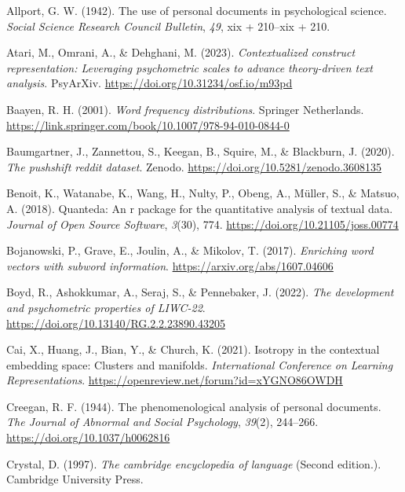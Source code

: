 \documentclass[
  man,
  floatsintext,
  longtable,
  nolmodern,
  notxfonts,
  notimes,
  colorlinks=true,linkcolor=blue,citecolor=blue,urlcolor=blue]{apa7}
\newlength{\cslhangindent}
\newenvironment{CSLReferences}[2] %
 {\begin{list}{}{%
  \setlength{\itemindent}{0pt}
  \setlength{\leftmargin}{0pt}
  \setlength{\parsep}{0pt}
  \ifodd #1
   \setlength{\leftmargin}{\cslhangindent}
   \setlength{\itemindent}{-1\cslhangindent}
  \fi
  \setlength{\itemsep}{#2\baselineskip}}}
 {\end{list}}
\begin{document}
\label{refs}
\begin{CSLReferences}{1}{0}
Allport, G. W. (1942). The use of personal documents in psychological
science. \emph{Social Science Research Council Bulletin}, \emph{49}, xix
+ 210--xix + 210.

Atari, M., Omrani, A., \& Dehghani, M. (2023). \emph{Contextualized
construct representation: Leveraging psychometric scales to advance
theory-driven text analysis}. PsyArXiv.
\url{https://doi.org/10.31234/osf.io/m93pd}

Baayen, R. H. (2001). \emph{Word frequency distributions}. Springer
Netherlands.
\url{https://link.springer.com/book/10.1007/978-94-010-0844-0}

Baumgartner, J., Zannettou, S., Keegan, B., Squire, M., \& Blackburn, J.
(2020). \emph{The pushshift reddit dataset}. Zenodo.
\url{https://doi.org/10.5281/zenodo.3608135}

Benoit, K., Watanabe, K., Wang, H., Nulty, P., Obeng, A., Müller, S., \&
Matsuo, A. (2018). Quanteda: An r package for the quantitative analysis
of textual data. \emph{Journal of Open Source Software}, \emph{3}(30),
774. \url{https://doi.org/10.21105/joss.00774}

Bojanowski, P., Grave, E., Joulin, A., \& Mikolov, T. (2017).
\emph{Enriching word vectors with subword information}.
\url{https://arxiv.org/abs/1607.04606}

Boyd, R., Ashokkumar, A., Seraj, S., \& Pennebaker, J. (2022). \emph{The
development and psychometric properties of LIWC-22}.
\url{https://doi.org/10.13140/RG.2.2.23890.43205}

Cai, X., Huang, J., Bian, Y., \& Church, K. (2021). Isotropy in the
contextual embedding space: Clusters and manifolds. \emph{International
Conference on Learning Representations}.
\url{https://openreview.net/forum?id=xYGNO86OWDH}

Creegan, R. F. (1944). The phenomenological analysis of personal
documents. \emph{The Journal of Abnormal and Social Psychology},
\emph{39}(2), 244--266. \url{https://doi.org/10.1037/h0062816}

Crystal, D. (1997). \emph{The cambridge encyclopedia of language}
(Second edition.). Cambridge University Press.


\end{CSLReferences}
\end{document}

